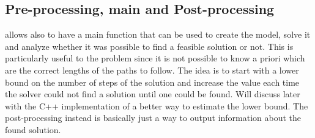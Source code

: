 \subsection{Pre-processing, main and Post-processing}
\OPL allows also to have a main function that can be used to create the model,
solve it and analyze whether it was possible to find a feasible solution or
not. This is particularly useful to the  problem since it is not
possible to know a priori which are the correct lengths of the paths to follow.
The idea is to start with a lower bound on the number of steps of the solution
and increase the value each time the solver could not find a solution until one
could be found. Will discuss later with the C++ implementation of a better way
to estimate the lower bound. \newline
The post-processing instead is basically just a way to output information
about the found solution. 
%
%
